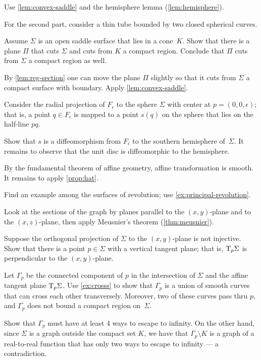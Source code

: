 \begin{multicols}{2}
Use \ref{lem:convex-saddle} and the hemisphere lemma (\ref{lem:hemisphere}).

For the second part, consider a thin tube bounded by two closed spherical curves.

Assume $\Sigma$ is an open saddle surface that lies in a cone~$K$.
Show that there is a plane $\Pi$ that cuts $\Sigma$ and cuts from $K$ a compact region.
Conclude that $\Pi$ cuts from $\Sigma$ a compact region as well. 

By \ref{lem:reg-section} one can move the plane $\Pi$ slightly so that it cuts from $\Sigma$ a compact surface with boundary.
Apply \ref{lem:convex-saddle}.


Consider the radial projection of $F_\epsilon$ to the sphere $\Sigma$ with center at $p=(0,0,\epsilon)$;
that is, a point $q\in F_\epsilon$ is mapped to a point $s(q)$ on the sphere that lies on the half-line $pq$.

Show that $s$ is a diffeomorphism from $F_\epsilon$ to the southern hemisphere of~$\Sigma$.
It remains to observe that the unit disc is diffeomorphic to the hemisphere.

By the fundamental theorem of affine geometry, affine transformation is smooth.
It remains to apply \ref{prop:hat}.

Find an example among the surfaces of revolution;
use \ref{ex:principal-revolution}.

 Look at the sections of the graph by planes parallel to the $(x,y)$-plane and to the $(x,z)$-plane, then apply Meusnier’s theorem (\ref{thm:meusnier}).

Suppose the orthogonal projection of $\Sigma$ to the $(x,y)$-plane is not injective.
Show that there is a point $p\in\Sigma$ with a vertical tangent plane;
that is, $\mathrm{T}_p\Sigma$ is perpendicular to the $(x,y)$-plane.

Let $\Gamma_p$ be the connected component of $p$ in the intersection of $\Sigma$ and the affine tangent plane $\mathrm{T}_p\Sigma$.
Use \ref{ex:crosss} to show that $\Gamma_p$ is a union of smooth curves that can cross each other transversely.
Moreover, two of these curves pass thru $p$, and $\Gamma_p$ does not bound a compact region on~$\Sigma$.

Show that $\Gamma_p$ must have at least 4 ways to escape to infinity.
On the other hand, since $\Sigma$ is a graph outside the compact set $K$, we have that $\Gamma_p\setminus K$ is a graph of a real-to-real function that has only two ways to escape to infinity --- a contradiction.


\end{multicols}
